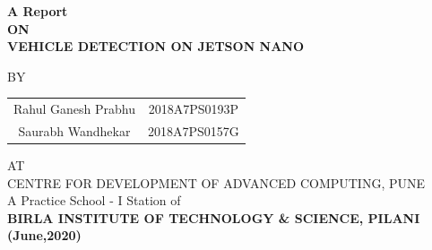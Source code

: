 \documentclass[12pt,letterpaper]{article}
\begin{document}


\thispagestyle{empty}

\begin{center}

{\Large \textbf{A Report} \\}
\medskip
{\large \textbf{ON} \\} 
\medskip
{\large \textbf{VEHICLE DETECTION ON JETSON NANO}}

\vskip 1.5in

{\large BY}
\bigskip

\addtolength{\tabcolsep}{20pt}
\begin{tabular}{cc}
    {\large Rahul Ganesh Prabhu} & {\large 2018A7PS0193P} \\
    {\large Saurabh Wandhekar} & {\large 2018A7PS0157G}
\end{tabular}
\addtolength{\tabcolsep}{-20pt}

\vskip 1.5in

{\large AT \\}
\medskip
{\large CENTRE FOR DEVELOPMENT OF ADVANCED COMPUTING, PUNE} \\ 
\vskip 0.4in
{\large A Practice School - I Station of} \\
\vskip 0.4in
{\large \textbf{BIRLA INSTITUTE OF TECHNOLOGY \& SCIENCE, PILANI}}
\vskip 0.4in
{\large \textbf{(June,2020)}}

\end{center}

\pagebreak



\thispagestyle{empty}
\end{document}
